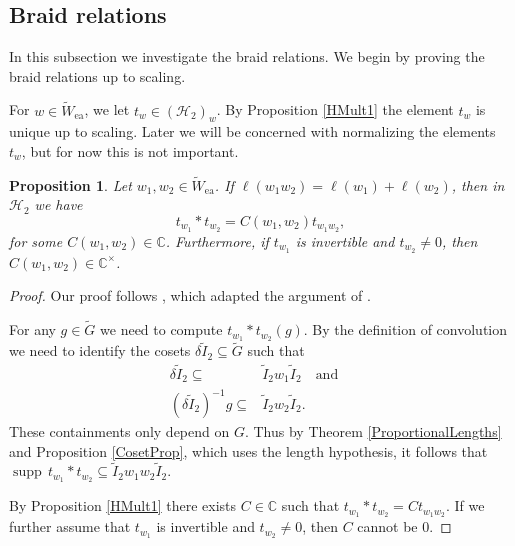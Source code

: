 \documentclass[10pt, letterpaper]{amsart}
\theoremstyle{plain}
\newtheorem{Prop}[equation]{Proposition}
\theoremstyle{definition}
\numberwithin{equation}{section}
\newcommand{\Gt}{\widetilde{G}}
\newcommand{\It}{\widetilde{I}}
\newcommand{\Wt}{\widetilde{W}}
\newcommand{\supp}{\operatorname{supp}}
\newcommand{\ea}{\mathrm{ea}}
\newcommand{\Hcal}{\mathcal{H}}
\newcommand{\qand}{{\quad\text{and}\quad}}
\begin{document}

\subsection{Braid relations}\label{SS:BraidRel}


In this subsection we investigate the braid relations. We begin by proving the braid relations up to scaling.

For $w\in \Wt_{\ea}$, we let $t_{w}\in (\Hcal_{2})_{w}$. By Proposition \ref{HMult1} the element $t_{w}$ is unique up to scaling. Later we will be concerned with normalizing the elements $t_{w}$, but for now this is not important.

\begin{Prop}\label{Prop:GenBraid}
	Let $w_{1},w_{2}\in \Wt_{\ea}$. If $\ell(w_{1}w_{2})=\ell(w_{1})+\ell(w_{2})$, then in $\Hcal_{2}$ we have 
    \[
    t_{w_{1}}*t_{w_{2}}=C(w_{1},w_{2})t_{w_{1}w_{2}},
    \]
    for some $C(w_{1},w_{2})\in\mathbb{C}$. Furthermore, if $t_{w_{1}}$ is invertible and $t_{w_{2}}\neq 0$, then $C(w_{1},w_{2})\in \mathbb{C}^{\times}$.
	
\end{Prop}

\begin{proof}
	Our proof follows \cite[Proposition 6.8]{Karasiewicz}, which adapted the argument of \cite[Proposition 6.2]{S04}.
	
	For any $g\in \Gt$ we need to compute $t_{w_{1}}*t_{w_{2}}(g)$. By the definition of convolution we need to identify the cosets $\delta\It_2\subseteq \Gt$ such that
	\begin{align*}
		\delta\It_2\subseteq& \It_2w_{1}\It_2\qand\\
		(\delta\It_2)^{-1}g\subseteq& \It_2w_{2}\It_2.
	\end{align*}
	These containments only depend on $G$. Thus by Theorem \ref{ProportionalLengths} and Proposition \ref{CosetProp}, which uses the length hypothesis, it follows that $\supp\,t_{w_{1}}*t_{w_{2}}\subseteq \It_2w_{1}w_{2}\It_2$.
	
	By Proposition \ref{HMult1} there exists $C\in\mathbb{C}$ such that $t_{w_{1}}*t_{w_{2}}=Ct_{w_{1}w_{2}}$. If we further assume that $t_{w_{1}}$ is invertible and $t_{w_{2}}\neq 0$, then $C$ cannot be $0$.
	\end{proof}
	
\end{document}
